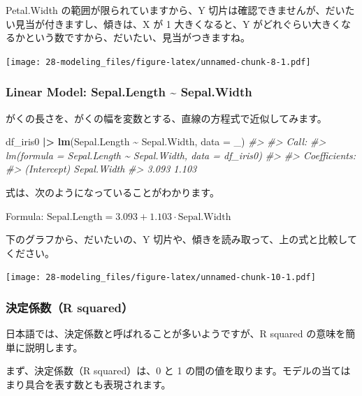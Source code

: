 \documentclass[
  xelatex, ja=standard]{bxjsbook}
\newenvironment{Shaded}{\begin{snugshade}}{\end{snugshade}}
\newcommand{\AttributeTok}[1]{\textcolor[rgb]{0.13,0.29,0.53}{#1}}
\newcommand{\CommentTok}[1]{\textcolor[rgb]{0.56,0.35,0.01}{\textit{#1}}}
\newcommand{\FunctionTok}[1]{\textcolor[rgb]{0.13,0.29,0.53}{\textbf{#1}}}
\newcommand{\NormalTok}[1]{#1}
\newcommand{\SpecialCharTok}[1]{\textcolor[rgb]{0.81,0.36,0.00}{\textbf{#1}}}
\theoremstyle{definition}
\theoremstyle{definition}
\theoremstyle{definition}
\theoremstyle{definition}
\theoremstyle{remark}
\begin{document}
Petal.Width の範囲が限られていますから、Y 切片は確認できませんが、だいたい見当が付きますし、傾きは、X が 1 大きくなると、Y がどれぐらい大きくなるかという数ですから、だいたい、見当がつきますね。

\texttt{[image: 28-modeling\_files/figure-latex/unnamed-chunk-8-1.pdf]}

\hypertarget{linear-model-sepal.length-sepal.width}{%
\subsubsection{Linear Model: Sepal.Length \textasciitilde{} Sepal.Width}\label{linear-model-sepal.length-sepal.width}}

がくの長さを、がくの幅を変数とする、直線の方程式で近似してみます。

\begin{Shaded}
\begin{Highlighting}[]
\NormalTok{df\_iris0 }\SpecialCharTok{|\textgreater{}} \FunctionTok{lm}\NormalTok{(Sepal.Length }\SpecialCharTok{\textasciitilde{}}\NormalTok{ Sepal.Width, }\AttributeTok{data =}\NormalTok{ \_)}
\CommentTok{\#\textgreater{} }
\CommentTok{\#\textgreater{} Call:}
\CommentTok{\#\textgreater{} lm(formula = Sepal.Length \textasciitilde{} Sepal.Width, data = df\_iris0)}
\CommentTok{\#\textgreater{} }
\CommentTok{\#\textgreater{} Coefficients:}
\CommentTok{\#\textgreater{} (Intercept)  Sepal.Width  }
\CommentTok{\#\textgreater{}       3.093        1.103}
\end{Highlighting}
\end{Shaded}

式は、次のようになっていることがわかります。

Formula: \(\text{Sepal.Length} = 3.093 + 1.103\cdot \text{Sepal.Width}\)

下のグラフから、だいたいの、Y 切片や、傾きを読み取って、上の式と比較してください。

\texttt{[image: 28-modeling\_files/figure-latex/unnamed-chunk-10-1.pdf]}

\hypertarget{ux6c7aux5b9aux4fc2ux6570r-squared}{%
\subsubsection{決定係数（R squared）}\label{ux6c7aux5b9aux4fc2ux6570r-squared}}

日本語では、決定係数と呼ばれることが多いようですが、R squared の意味を簡単に説明します。

まず、決定係数（R squared）は、0 と 1 の間の値を取ります。モデルの当てはまり具合を表す数とも表現されます。
\end{document}
